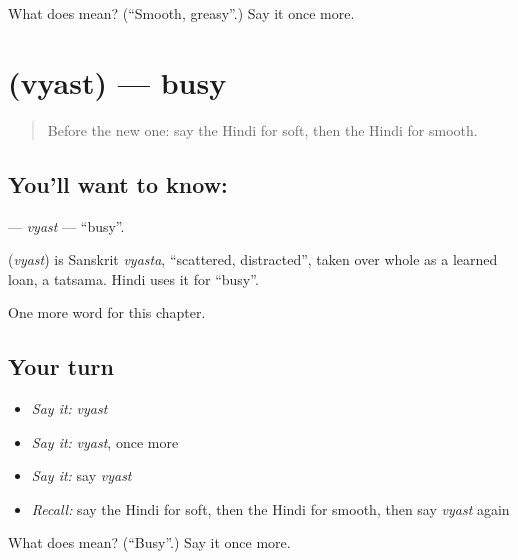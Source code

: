 \begin{tcolorbox}[breakable,colback=teal!4,colframe=teal!35!black,title={Before you move on}]
What does  mean? (\textquotedblleft{}Smooth, greasy\textquotedblright{}.) Say it once more.
\end{tcolorbox}
\section[\texorpdfstring{\hi{व्यस्त} (vyast)}{व्यस्त (vyast)}]{ (vyast) — busy}

\label{lesson:HI-C214-vyast}



\begin{quote}
Before the new one: say the Hindi for soft, then the Hindi for smooth.
\end{quote}

\subsection*{You'll want to know: }
\textbf{} — \emph{vyast} — \textquotedblleft{}busy\textquotedblright{}.

\begin{cousinweb}
\textbf{} (\emph{vyast}) is Sanskrit \emph{vyasta}, \textquotedblleft{}scattered, distracted\textquotedblright{}, taken over whole as a learned loan, a tatsama. Hindi uses it for \textquotedblleft{}busy\textquotedblright{}.
\end{cousinweb}

\begin{grammarlens}[title={What you've built}]
One more word for this chapter.
\end{grammarlens}

\subsection*{Your turn}
\begin{itemize}
\raggedright
  \item \emph{Say it:} \emph{vyast}
  \item \emph{Say it:} \emph{vyast}, once more
  \item \emph{Say it:} say \emph{vyast}
  \item \emph{Recall:} say the Hindi for soft, then the Hindi for smooth, then say \emph{vyast} again
\end{itemize}

\begin{tcolorbox}[breakable,colback=teal!4,colframe=teal!35!black,title={Before you move on}]
What does  mean? (\textquotedblleft{}Busy\textquotedblright{}.) Say it once more.
\end{tcolorbox}
